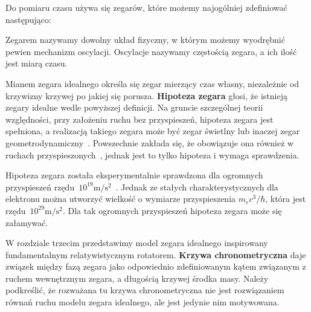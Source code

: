 Do pomiaru czasu używa się zegarów, które możemy 
najogólniej zdefiniować następująco:
\begin{definition}
Zegarem nazywamy dowolny układ fizyczny, w którym możemy wyodrębnić pewien
mechanizm oscylacji. Oscylacje nazywamy częstością zegara, a ich ilość jest
miarą czasu.
\end{definition}
Mianem zegara idealnego określa się zegar mierzący czas własny,
niezależnie od krzywizny krzywej po jakiej się porusza.
\textbf{Hipoteza zegara} głosi, że istnieją zegary idealne wedle 
powyższej definicji.
Na gruncie szczególnej teorii względności, przy założeniu ruchu
bez przyspieszeń, hipoteza zegara jest spełniona, a 
realizacją takiego zegara może być zegar świetlny lub inaczej
zegar geometrodynamiczny~\cite{ohanian2013gravitation}.
Powszechnie zakłada się, że obowiązuje 
ona również w ruchach przyspieszonych~\cite{trau1984},
jednak jest to tylko hipoteza i wymaga sprawdzenia.

Hipoteza zegara 
została eksperymentalnie sprawdzona dla ogromnych 
przyspieszeń 
rzędu~$10^{19}\si{\metre\per\second^2}$~\cite{Bailey1977}. Jednak 
ze stałych charakterystycznych dla elektronu 
można utworzyć wielkość o wymiarze przyspieszenia $m_e c^3/\hbar$, 
która jest rzędu~$10^{29}\si{\metre\per\second^2}$. Dla 
tak ogromnych przyspieszeń hipoteza zegara może się załamywać.

W rozdziale trzecim przedstawimy model zegara idealnego inspirowany
fundamentalnym relatywistycznym rotatorem. 
\textbf{Krzywa chronometryczna} daje związek między fazą zegara jako 
odpowiednio zdefiniowanym kątem związanym z ruchem 
wewnętrznym zegara, a długością krzywej 
środka masy. Należy podkreślić, że rozważana 
tu krzywa chronometryczna nie jest rozwiązaniem równań ruchu 
modelu zegara idealnego, ale jest jedynie nim motywowana.

